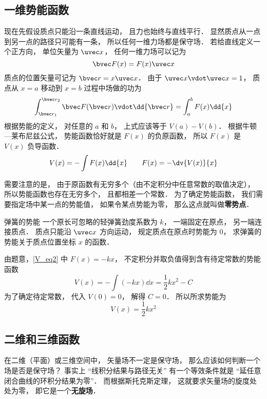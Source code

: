 \subsection{一维势能函数}

现在先假设质点只能沿一条直线运动， 且力也始终与直线平行． 显然质点从一点到另一点的路径只可能有一条， 所以任何一维力场都是保守场． 若给直线定义一个正方向， 单位矢量为 $\uvec x$， 任何一维力场可以记为
\begin{equation}\label{V_eq2}
\bvec F(x) = F(x) \uvec x
\end{equation}
质点的位置矢量可记为 $\bvec r = x \uvec x$． 由于 $\uvec x \vdot \uvec x = 1$， 质点从 $x = a$ 移动到 $x=b$ 过程中场做的功为
\begin{equation}
\int_{\bvec r_1}^{\bvec r_2} \bvec F(\bvec r) \vdot \dd{\bvec r}
= \int_a^b F(x) \dd{x}
\end{equation}
根据势能的定义， 对任意的 $a$ 和 $b$， 上式应该等于 $V(a) - V(b)$． 根据牛顿—莱布尼兹公式， 势能函数恰好就是 $F(x)$ 的负原函数， 所以 $F(x)$ 是 $V(x)$ 负导函数．
\begin{equation}\label{V_eq8}
V(x) = -\int F(x) \dd{x}
\qquad
F(x) = -\dv{V(x)}{x}
\end{equation}

需要注意的是， 由于原函数有无穷多个（由不定积分中任意常数的取值决定）， 所以势能函数也存在无穷多个， 且都相差一个常数． 为了确定势能函数， 我们需要指定场中某一点的势能值， 如果令某点势能为零， 那么这点就叫做\textbf{零势点}．

\begin{example}{弹簧的势能}
一个原长可忽略的轻弹簧劲度系数为 $k$， 一端固定在原点， 另一端连接质点． 质点只能沿 $\uvec x$ 方向运动， 规定质点在原点时势能为 $0$， 求弹簧的势能关于质点位置坐标 $x$ 的函数． 

由题意，\autoref{V_eq2} 中 $F(x) = -kx$， 不定积分并取负值得到含有待定常数的势能函数
\begin{equation}
V(x) = -\int (-kx) \dd{x} = \frac12 k x^2 - C
\end{equation}
为了确定待定常数， 代入 $V(0) = 0$， 解得 $C = 0$． 所以所求势能为
\begin{equation}
V(x) =  \frac12 k x^2
\end{equation}
\end{example}

\subsection{二维和三维函数}
在二维（平面）或三维空间中， 矢量场不一定是保守场， 那么应该如何判断一个场是否是保守场？ 事实上 “线积分结果与路径无关” 有一个等效条件就是 “延任意闭合曲线的环积分结果为零”． 而根据斯托克斯定理， 这就要求矢量场的旋度处处为零， 即它是一个\textbf{无旋场}．

